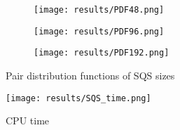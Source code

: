 \begin{figure}[H]
\begin{subfigure}{\textwidth}
\texttt{[image: results/PDF48.png]}
\end{subfigure}
\begin{subfigure}{\textwidth}
\texttt{[image: results/PDF96.png]}
\end{subfigure}
\begin{subfigure}{\textwidth}
\texttt{[image: results/PDF192.png]}
\end{subfigure}
\caption{Pair distribution functions of SQS sizes}
\end{figure}


\begin{figure}[H]
\centering
\texttt{[image: results/SQS\_time.png]}
\caption{CPU time}
\end{figure}



